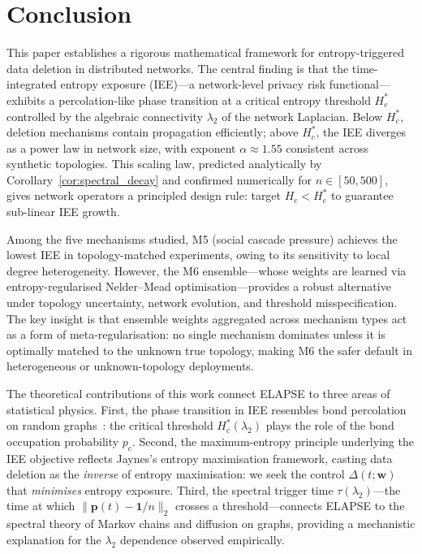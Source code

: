 
\section{Conclusion}
\label{sec:conclusion}

This paper establishes a rigorous mathematical framework for entropy-triggered
data deletion in distributed networks. The central finding is that the
time-integrated entropy exposure (IEE)---a network-level privacy risk
functional---exhibits a percolation-like phase transition at a critical
entropy threshold $H_c^*$ controlled by the algebraic connectivity $\lambda_2$
of the network Laplacian. Below $H_c^*$, deletion mechanisms contain
propagation efficiently; above $H_c^*$, the IEE diverges as a power law in
network size, with exponent $\alpha \approx 1.55$ consistent across synthetic
topologies. This scaling law, predicted analytically by Corollary~\ref{cor:spectral_decay}
and confirmed numerically for $n \in [50, 500]$, gives network operators a
principled design rule: target $H_c < H_c^*$ to guarantee sub-linear IEE growth.

Among the five mechanisms studied, M5 (social cascade pressure) achieves the
lowest IEE in topology-matched experiments, owing to its sensitivity to local
degree heterogeneity. However, the M6 ensemble---whose weights are learned via
entropy-regularised Nelder--Mead optimisation---provides a robust alternative
under topology uncertainty, network evolution, and threshold misspecification.
The key insight is that ensemble weights aggregated across mechanism types
act as a form of meta-regularisation: no single mechanism dominates unless
it is optimally matched to the unknown true topology, making M6 the safer
default in heterogeneous or unknown-topology deployments.

The theoretical contributions of this work connect ELAPSE to three areas of
statistical physics. First, the phase transition in IEE resembles bond
percolation on random graphs~\cite{Erdos1960}: the critical threshold
$H_c^*(\lambda_2)$ plays the role of the bond occupation probability $p_c$.
Second, the maximum-entropy principle underlying the IEE objective reflects
Jaynes's entropy maximisation framework, casting data deletion as the
\emph{inverse} of entropy maximisation: we seek the control $\Delta(t;\mathbf{w})$
that \emph{minimises} entropy exposure. Third, the spectral trigger time
$\tau(\lambda_2)$---the time at which $\|\mathbf{p}(t) - \mathbf{1}/n\|_2$ crosses a
threshold---connects ELAPSE to the spectral theory of Markov chains and
diffusion on graphs, providing a mechanistic explanation for the $\lambda_2$
dependence observed empirically.

